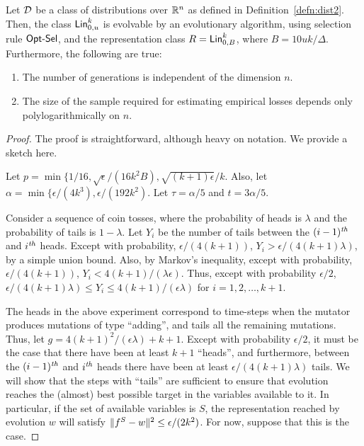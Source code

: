 \begin{theorem} Let ${\mathcal D}$ be a class of distributions over $\mathbb{R}^n$ as
defined in Definition~\ref{defn:dist2}. Then, the class $\mathsf{Lin}^k_{0, u}$ is
evolvable by an evolutionary algorithm, using selection rule $\mathsf{Opt\mbox{-}Sel}$, and the
representation class $R = \mathsf{Lin}^k_{0, B}$, where $B = 10 uk/\Delta$. Furthermore,
the following are true:
\begin{enumerate}
\item The number of generations is independent of the dimension $n$.
\item The size of the sample required for estimating empirical losses depends
only polylogarithmically on $n$.
\end{enumerate}
\end{theorem}
\begin{proof} The proof is straightforward, although heavy on notation. We provide a sketch here. 

Let $p = \min\{1 /16, \sqrt{\epsilon}/(16k^2 B), \sqrt{(k+1)\epsilon}/k$. Also,
let $\alpha = \min\{\epsilon/(4k^3), \epsilon/(192k^2)$. Let $\tau = \alpha/5$
and $t = 3\alpha/5$.

Consider a sequence of coin tosses, where the probability of heads is $\lambda$
and the probability of tails is $1 - \lambda$. Let $Y_i$ be the number of tails
between the $(i-1){^{\textit{th}}}$ and $i{^{\textit{th}}}$ heads. Except with probability,
$\epsilon/(4(k+1))$, $Y_i > \epsilon/(4(k+1)\lambda)$, by a simple union bound.
Also, by Markov's inequality, except with probability, $\epsilon/(4(k+1))$, $Y_i
< 4(k+1)/(\lambda\epsilon)$. Thus, except with probability $\epsilon/2$, $
\epsilon/(4(k+1)\lambda) \leq Y_i \leq 4(k+1)/(\epsilon\lambda)$ for $i = 1, 2,
\ldots, k+1$. 

The heads in the above experiment correspond to time-steps when the mutator
produces mutations of type ``adding'', and tails all the remaining mutations.
Thus, let $g = 4(k+1)^2/(\epsilon\lambda) + k + 1$. Except with probability
$\epsilon/2$, it must be the case that there have been at least $k + 1$
``heads'', and furthermore, between the $(i-1){^{\textit{th}}}$ and $i{^{\textit{th}}}$ heads there have
been at least $\epsilon/(4(k+1)\lambda)$ tails. We will show that the steps with
``tails'' are sufficient to ensure that evolution reaches the (almost) best
possible target in the variables available to it. In particular, if the set of
available variables is $S$, the representation reached by evolution $w$ will
satisfy $\Vert f^S - w \Vert^2 \leq \epsilon/(2k^2)$. For now, suppose that this
is the case. 


\end{proof}
